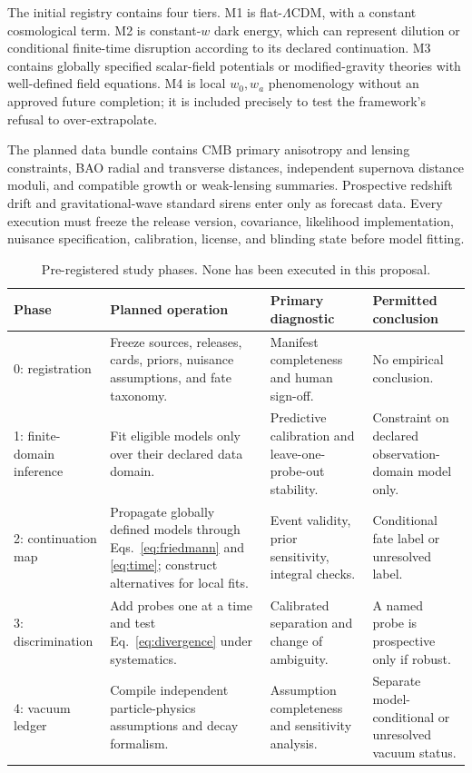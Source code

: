 \documentclass[conference]{IEEEtran}
\newcommand{\lcdm}{\ensuremath{\Lambda\mathrm{CDM}}}
\begin{document}
The initial registry contains four tiers. M1 is flat-\lcdm{}, with a constant cosmological term. M2 is constant-\(w\) dark energy, which can represent dilution or conditional finite-time disruption according to its declared continuation. M3 contains globally specified scalar-field potentials or modified-gravity theories with well-defined field equations. M4 is local \(w_0,w_a\) phenomenology without an approved future completion; it is included precisely to test the framework's refusal to over-extrapolate.

The planned data bundle contains CMB primary anisotropy and lensing constraints, BAO radial and transverse distances, independent supernova distance moduli, and compatible growth or weak-lensing summaries. Prospective redshift drift and gravitational-wave standard sirens enter only as forecast data. Every execution must freeze the release version, covariance, likelihood implementation, nuisance specification, calibration, license, and blinding state before model fitting.

\begin{table}[t]
\caption{Pre-registered study phases. None has been executed in this proposal.}
\label{tab:design}
\centering
\footnotesize
\setlength{\tabcolsep}{3pt}
\begin{tabular}{p{} p{} p{} p{}}
\hline
\textbf{Phase} & \textbf{Planned operation} & \textbf{Primary diagnostic} & \textbf{Permitted conclusion}\\
\hline
0: registration & Freeze sources, releases, cards, priors, nuisance assumptions, and fate taxonomy. & Manifest completeness and human sign-off. & No empirical conclusion.\\
1: finite-domain inference & Fit eligible models only over their declared data domain. & Predictive calibration and leave-one-probe-out stability. & Constraint on declared observation-domain model only.\\
2: continuation map & Propagate globally defined models through Eqs.~\eqref{eq:friedmann} and \eqref{eq:time}; construct alternatives for local fits. & Event validity, prior sensitivity, integral checks. & Conditional fate label or unresolved label.\\
3: discrimination & Add probes one at a time and test Eq.~\eqref{eq:divergence} under systematics. & Calibrated separation and change of ambiguity. & A named probe is prospective only if robust.\\
4: vacuum ledger & Compile independent particle-physics assumptions and decay formalism. & Assumption completeness and sensitivity analysis. & Separate model-conditional or unresolved vacuum status.\\
\hline
\end{tabular}
\end{table}
\end{document}

